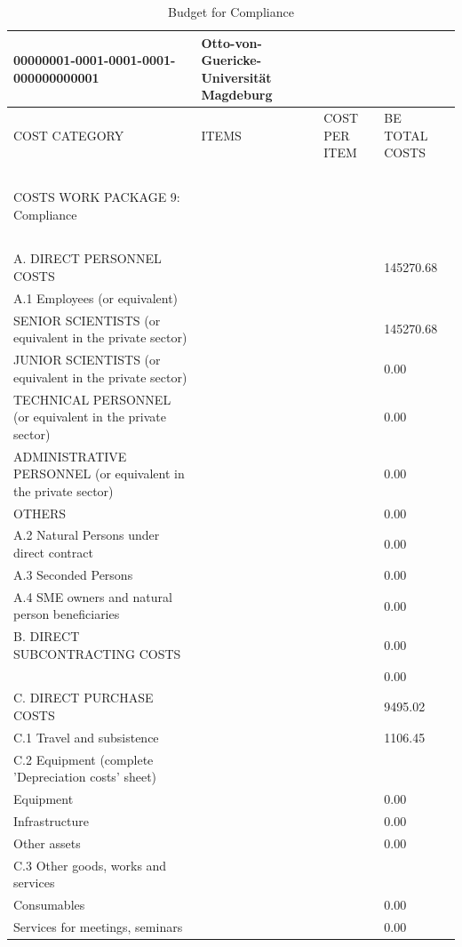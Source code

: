 \begin{table}[H]
\centering
\caption{Budget for Compliance}
\begin{tabular}{|l|l|l|l|}
\hline
00000001-0001-0001-0001-000000000001 & Otto-von-Guericke-Universität Magdeburg & ~ & ~ \\ \hline
COST CATEGORY & ITEMS & COST PER ITEM & BE TOTAL COSTS \\ \hline
~ & ~ & ~ & ~ \\ \hline
COSTS WORK PACKAGE 9: Compliance & ~ & ~ & ~ \\ \hline
~ & ~ & ~ & ~ \\ \hline
A. DIRECT PERSONNEL COSTS & ~ & ~ & 145270.68 \\ \hline
A.1 Employees (or equivalent) & ~ & ~ & ~ \\ \hline
SENIOR SCIENTISTS (or equivalent in the private sector) & ~ & ~ & 145270.68 \\ \hline
JUNIOR SCIENTISTS (or equivalent in the private sector) & ~ & ~ & 0.00 \\ \hline
TECHNICAL PERSONNEL (or equivalent in the private sector) & ~ & ~ & 0.00 \\ \hline
ADMINISTRATIVE PERSONNEL (or equivalent in the private sector) & ~ & ~ & 0.00 \\ \hline
OTHERS & ~ & ~ & 0.00 \\ \hline
A.2 Natural Persons under direct contract & ~ & ~ & 0.00 \\ \hline
A.3 Seconded Persons & ~ & ~ & 0.00 \\ \hline
A.4 SME owners and natural person beneficiaries & ~ &  & 0.00 \\ \hline
B. DIRECT SUBCONTRACTING COSTS & ~ & ~ & 0.00\\ \hline
~ & ~ & ~ & 0.00 \\ \hline
C. DIRECT PURCHASE COSTS & ~ & ~ & 9495.02 \\ \hline
C.1 Travel and subsistence & ~ &  & 1106.45 \\ \hline
C.2 Equipment (complete 'Depreciation costs' sheet) & ~ & ~ & ~ \\ \hline
Equipment & ~ &  & 0.00 \\ \hline
Infrastructure & ~ &  & 0.00 \\ \hline
Other assets & ~ &  & 0.00 \\ \hline
C.3 Other goods, works and services & ~ & ~ & ~ \\ \hline
Consumables & ~ &  & 0.00 \\ \hline
Services for meetings, seminars & ~ & ~ & 0.00 \\ \hline

\end{tabular}
\end{table}

